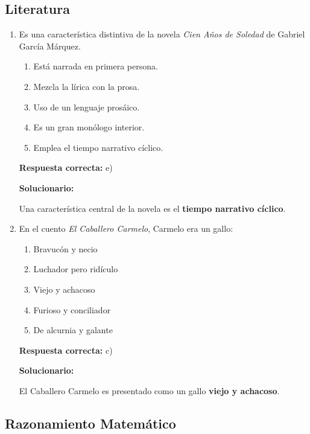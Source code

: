 \subsection*{Literatura}

\begin{enumerate}[resume]
	
	\item Es una característica distintiva de la novela \textit{Cien Años de Soledad} de Gabriel García Márquez.
	\begin{enumerate}[label=\alph*)]
		\item Está narrada en primera persona.
		\item Mezcla la lírica con la prosa.
		\item Uso de un lenguaje prosáico.
		\item Es un gran monólogo interior.
		\item Emplea el tiempo narrativo cíclico.
	\end{enumerate}
	\textbf{Respuesta correcta:} e)
	
	\vspace{2mm}
	\textbf{Solucionario:}
	
	Una característica central de la novela es el \textbf{tiempo narrativo cíclico}.
	
	\vspace{6mm}
	
	\item En el cuento \textit{El Caballero Carmelo}, Carmelo era un gallo:
	\begin{enumerate}[label=\alph*)]
		\item Bravucón y necio
		\item Luchador pero ridículo
		\item Viejo y achacoso
		\item Furioso y conciliador
		\item De alcurnia y galante
	\end{enumerate}
	\textbf{Respuesta correcta:} c)
	
	\vspace{2mm}
	\textbf{Solucionario:}
	
	El Caballero Carmelo es presentado como un gallo \textbf{viejo y achacoso}.
	
	\vspace{6mm}
	
\end{enumerate}

\subsection*{Razonamiento Matemático}

